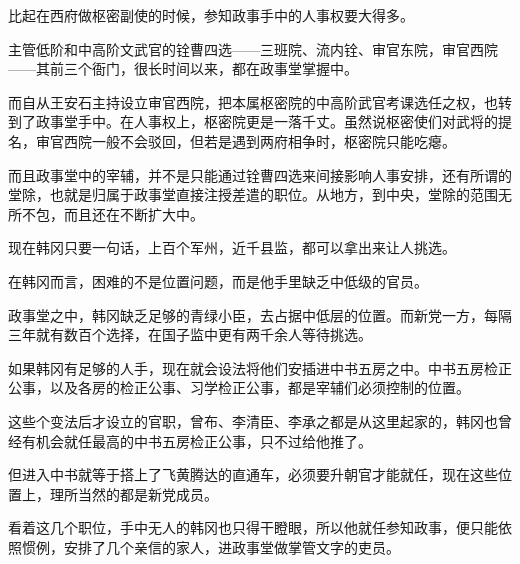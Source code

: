 比起在西府做枢密副使的时候，参知政事手中的人事权要大得多。

主管低阶和中高阶文武官的铨曹四选——三班院、流内铨、审官东院，审官西院——其前三个衙门，很长时间以来，都在政事堂掌握中。

而自从王安石主持设立审官西院，把本属枢密院的中高阶武官考课选任之权，也转到了政事堂手中。在人事权上，枢密院更是一落千丈。虽然说枢密使们对武将的提名，审官西院一般不会驳回，但若是遇到两府相争时，枢密院只能吃瘪。

而且政事堂中的宰辅，并不是只能通过铨曹四选来间接影响人事安排，还有所谓的堂除，也就是归属于政事堂直接注授差遣的职位。从地方，到中央，堂除的范围无所不包，而且还在不断扩大中。

现在韩冈只要一句话，上百个军州，近千县监，都可以拿出来让人挑选。

在韩冈而言，困难的不是位置问题，而是他手里缺乏中低级的官员。

政事堂之中，韩冈缺乏足够的青绿小臣，去占据中低层的位置。而新党一方，每隔三年就有数百个选择，在国子监中更有两千余人等待挑选。

如果韩冈有足够的人手，现在就会设法将他们安插进中书五房之中。中书五房检正公事，以及各房的检正公事、习学检正公事，都是宰辅们必须控制的位置。

这些个变法后才设立的官职，曾布、李清臣、李承之都是从这里起家的，韩冈也曾经有机会就任最高的中书五房检正公事，只不过给他推了。

但进入中书就等于搭上了飞黄腾达的直通车，必须要升朝官才能就任，现在这些位置上，理所当然的都是新党成员。

看着这几个职位，手中无人的韩冈也只得干瞪眼，所以他就任参知政事，便只能依照惯例，安排了几个亲信的家人，进政事堂做掌管文字的吏员。

